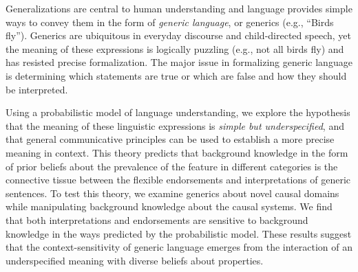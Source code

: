 \documentclass[10pt,letterpaper]{article}
\begin{document}
Generalizations are central to human understanding and language provides simple ways to convey them in the form of \emph{generic language}, or generics (e.g., ``Birds fly''). 
Generics are ubiquitous in everyday discourse and child-directed speech, yet the meaning of these expressions is logically puzzling (e.g., not all birds fly) and has resisted precise formalization. 
The major issue in formalizing generic language is determining which statements are true or which are false and how they should be interpreted.

Using a probabilistic model of language understanding, we explore the hypothesis that the meaning of these linguistic expressions is \emph{simple but underspecified}, and that general communicative principles can be used to establish a more precise meaning in context. 
This theory predicts that background knowledge in the form of prior beliefs about the prevalence of the feature in different categories is the connective tissue between the flexible endorsements and interpretations of generic sentences. 
To test this theory, we examine generics about novel causal domains while manipulating background knowledge about the causal systems. 
We find that both interpretations and endorsements are sensitive to background knowledge in the ways predicted by the probabilistic model. 
These results suggest that the context-sensitivity of generic language emerges from the interaction of an underspecified meaning with diverse beliefs about properties.

\end{document}
